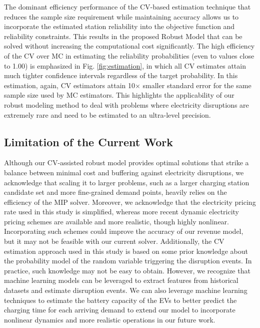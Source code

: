 \documentclass[preprint]{oscmjournal}
\theoremstyle{remark}
\begin{document}
The dominant efficiency performance of the CV-based estimation technique that reduces the sample size requirement while maintaining accuracy allows us to incorporate the estimated station reliability into the objective function and reliability constraints. This results in the proposed Robust Model that can be solved without increasing the computational cost significantly. The high efficiency of the CV over MC  in estimating the reliability probabilities (even to values close to 1.00) is emphasized in Fig. \ref{fig:estimation}, in which all CV estimates attain much tighter confidence intervals regardless of the target probability. In this estimation, again, CV estimators attain 10$\times$ smaller standard error for the same sample size used by MC estimators. This highlights the applicability of our robust modeling method to deal with problems where electricity disruptions are extremely rare and need to be estimated to an ultra-level precision.

\subsection{Limitation of the Current Work}

Although our CV-assisted robust model provides optimal solutions that strike a balance between minimal cost and buffering against electricity disruptions, we acknowledge that scaling it to larger problems, such as a larger charging station candidate set and more fine-grained demand points, heavily relies on the efficiency of the MIP solver. Moreover, we acknowledge that the electricity pricing rate used in this study is simplified, whereas more recent dynamic electricity pricing schemes are available and more realistic, though highly nonlinear. Incorporating such schemes could improve the accuracy of our revenue model, but it may not be feasible with our current solver. Additionally, the CV estimation approach used in this study is based on some prior knowledge about the probability model of the random variable triggering the disruption events. In practice, such knowledge may not be easy to obtain. However, we recognize that machine learning models can be leveraged to extract features from historical datasets and estimate disruption events. We can also leverage machine learning techniques to estimate the battery capacity of the EVs \autocite{zhao2023machine} to better predict the charging time for each arriving demand to extend our model to incorporate nonlinear dynamics and more realistic operations in our future work.
\end{document}

